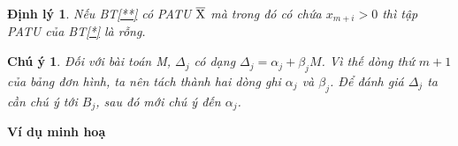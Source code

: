 \documentclass{article}
\newtheorem{dl}{Định lý}
\newtheorem{cy}{Chú ý}
\begin{document}
\begin{enumerate}
\begin{dl}
                                \item Nếu BT\eqref{**} có PATU $\overline{\rm X}$ mà trong đó có chứa $x_{m+i}>0$ thì tập PATU của BT\eqref{*} là rỗng.
                            \end{dl}
                            \begin{cy}
                                Đối với bài toán M, $\Delta_j$ có dạng $\Delta_j=\alpha_j+\beta_jM$. Vì thế dòng thứ $m+1$ của bảng đơn hình, ta nên tách thành hai dòng ghi $\alpha _j$ và $\beta_j$. Để đánh giá $\Delta_j$ ta cần chú ý tới $B_j$, sau đó mới chú ý đến $\alpha_j$.
                            \end{cy} 
                    \item \textbf{Ví dụ minh hoạ} \\          
                \end{enumerate}
\end{document}
